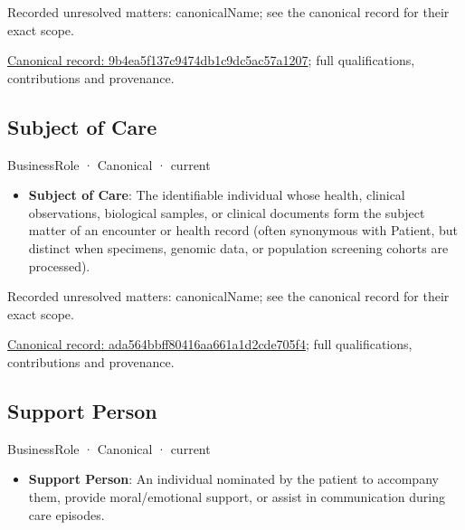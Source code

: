 {\small Recorded unresolved matters: canonicalName; see the canonical record for their exact scope.}\par
{\footnotesize \href{../../../../continuum/business/business-role/9b4ea5f137c9474db1c9dc5ac57a1207.md}{Canonical record: 9b4ea5f137c9474db1c9dc5ac57a1207}; full qualifications, contributions and provenance.}\par
\subsection{Subject of Care}

\label{element:ada564bbff80416aa661a1d2cde705f4}
{\small BusinessRole · Canonical · current}\par

\begin{itemize}


\item \textbf{Subject of Care}: The identifiable individual whose health, clinical observations, biological samples, or clinical documents form the subject matter of an encounter or health record (often synonymous with Patient, but distinct when specimens, genomic data, or population screening cohorts are processed).

\end{itemize}

{\small Recorded unresolved matters: canonicalName; see the canonical record for their exact scope.}\par
{\footnotesize \href{../../../../continuum/business/business-role/ada564bbff80416aa661a1d2cde705f4.md}{Canonical record: ada564bbff80416aa661a1d2cde705f4}; full qualifications, contributions and provenance.}\par
\subsection{Support Person}

\label{element:c2334e0e5c3b40789c672471ea82c465}
{\small BusinessRole · Canonical · current}\par

\begin{itemize}


\item \textbf{Support Person}: An individual nominated by the patient to accompany them, provide moral/emotional support, or assist in communication during care episodes.

\end{itemize}

